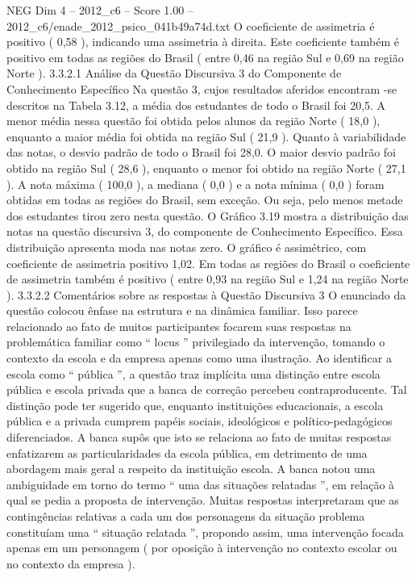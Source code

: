 \begin{textsample}{NEG Dim 4 – 2012\_c6 – Score 1.00 – 2012\_c6/enade\_2012\_psico\_041b49a74d.txt}
O coeficiente de assimetria é positivo ( 0,58 ), indicando uma assimetria à direita.
Este coeficiente também é positivo em todas as regiões do Brasil ( entre 0,46 na região Sul e 0,69 na região Norte ). 3.3.2.1 Análise da Questão Discursiva 3 do Componente de Conhecimento Específico Na questão 3, cujos resultados aferidos encontram -se descritos na Tabela 3.12, a média dos estudantes de todo o Brasil foi 20,5.
A menor média nessa questão foi obtida pelos alunos da região Norte ( 18,0 ), enquanto a maior média foi obtida na região Sul ( 21,9 ).
Quanto à variabilidade das notas, o desvio padrão de todo o Brasil foi 28,0.
O maior desvio padrão foi obtido na região Sul ( 28,6 ), enquanto o menor foi obtido na região Norte ( 27,1 ).
A nota máxima ( 100,0 ), a mediana ( 0,0 ) e a nota mínima ( 0,0 ) foram obtidas em todas as regiões do Brasil, sem exceção.
Ou seja, pelo menos metade dos estudantes tirou zero nesta questão.
O Gráfico 3.19 mostra a distribuição das notas na questão discursiva 3, do componente de Conhecimento Específico.
Essa distribuição apresenta moda nas notas zero.
O gráfico é assimétrico, com coeficiente de assimetria positivo 1,02.
Em todas as regiões do Brasil o coeficiente de assimetria também é positivo ( entre 0,93 na região Sul e 1,24 na região Norte ). 3.3.2.2 Comentários sobre as respostas à Questão Discursiva 3 O enunciado da questão colocou ênfase na estrutura e na dinâmica familiar.
Isso parece relacionado ao fato de muitos participantes focarem suas respostas na problemática familiar como “ locus ” privilegiado da intervenção, tomando o contexto da escola e da empresa apenas como uma ilustração.
Ao identificar a escola como “ pública ”, a questão traz implícita uma distinção entre escola pública e escola privada que a banca de correção percebeu contraproducente.
Tal distinção pode ter sugerido que, enquanto instituições educacionais, a escola pública e a privada cumprem papéis sociais, ideológicos e político-pedagógicos diferenciados.
A banca supôs que isto se relaciona ao fato de muitas respostas enfatizarem as particularidades da escola pública, em detrimento de uma abordagem mais geral a respeito da instituição escola.
A banca notou uma ambiguidade em torno do termo “ uma das situações relatadas ”, em relação à qual se pedia a proposta de intervenção.
Muitas respostas interpretaram que as contingências relativas a cada um dos personagens da situação problema constituíam uma “ situação relatada ”, propondo assim, uma intervenção focada apenas em um personagem ( por oposição à intervenção no contexto escolar ou no contexto da empresa ).

\end{textsample}
